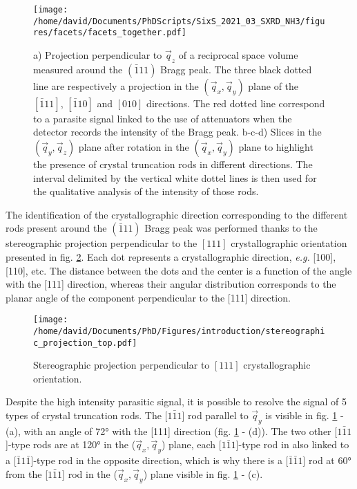 \begin{figure}[!htb]
    \centering
    \texttt{[image: /home/david/Documents/PhDScripts/SixS\_2021\_03\_SXRD\_NH3/figures/facets/facets\_together.pdf]}
    \caption{
        a) Projection perpendicular to $\vec{q}_z$ of a reciprocal space volume measured around the $(\bar{1}11)$ Bragg peak.
        The three black dotted line are respectively a projection in the $(\vec{q}_x, \vec{q}_y)$ plane of the $[\bar{1}11]$, $[\bar{1}10]$ and $[010]$ directions.
        The red dotted line correspond to a parasite signal linked to the use of attenuators when the detector records the intensity of the Bragg peak.
        b-c-d) Slices in the $(\vec{q}_y, \vec{q}_z)$ plane after rotation in the $(\vec{q}_x, \vec{q}_y)$ plane to highlight the presence of crystal truncation rods in different directions.
        The interval delimited by the vertical white dottel lines is then used for the qualitative analysis of the intensity of those rods.
    }
    \label{fig:FacetMaps}
\end{figure}

The identification of the crystallographic direction corresponding to the different rods present around the $(\bar{1}11)$ Bragg peak was performed thanks to the stereographic projection perpendicular to the $[111]$ crystallographic orientation presented in fig. \ref{fig:StereoTop}.
Each dot represents a crystallographic direction, \textit{e.g.} [100], [110], etc.
The distance between the dots and the center is a function of the angle with the [111] direction, whereas their angular distribution corresponds to the planar angle of the component perpendicular to the [111] direction.

\begin{figure}[!htb]
    \centering
    \texttt{[image: /home/david/Documents/PhD/Figures/introduction/stereographic\_projection\_top.pdf]}
    \caption{
        Stereographic projection perpendicular to $[111]$ crystallographic orientation.
    }
    \label{fig:StereoTop}
\end{figure}

Despite the high intensity parasitic signal, it is possible to resolve the signal of 5 types of crystal truncation rods.
The [$1\bar{1}1$] rod parallel to $\vec{q}_y$ is visible in fig. \ref{fig:FacetMaps} - (a), with an angle of \ang{72} with the [111] direction (fig. \ref{fig:FacetMaps} - (d)).
The two other [$1\bar{1}1$]-type rods are at \ang{120} in the ($\vec{q}_x, \vec{q}_y$) plane, each [$1\bar{1}1$]-type rod in also linked to a [$\bar{1}1\bar{1}$]-type rod in the opposite direction, which is why there is a [$\bar{1}\bar{1}1$] rod at \ang{60} from the [$1\bar{1}1$] rod in the ($\vec{q}_x, \vec{q}_y$) plane visible in fig. \ref{fig:FacetMaps} - (c).

